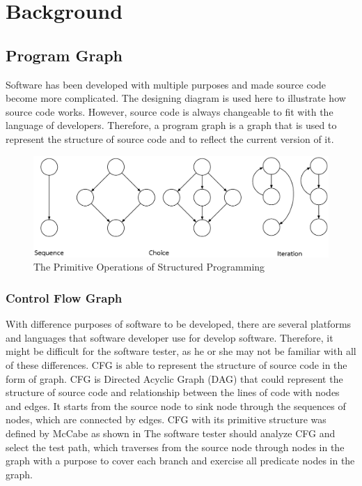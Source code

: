\section{Background}

\subsection{Program Graph}

Software has been developed with multiple purposes and made 
source code become more complicated. The designing diagram 
is used here to illustrate how source code works. However, 
source code is always changeable to fit with the language 
of developers. Therefore, a program graph is a graph 
that is used to represent the structure of source code and 
to reflect the current version of it.

\begin{figure}[ht!]
    \centering
    \includegraphics[width=0.9\linewidth]{figures/Primitive-Operation-Structure}
    \caption{The Primitive Operations of Structured Programming}
    \label{fig:primitiveoperations}
\end{figure}

\subsubsection{Control Flow Graph}
With difference purposes of software to be developed, 
there are several platforms and languages 
that software developer use for develop software. 
Therefore, it might be difficult for the software tester, 
as he or she may not be familiar with all of these differences. 
CFG is able to represent the structure of source code in 
the form of graph. CFG is Directed Acyclic Graph (DAG) 
that could represent the structure of source code and relationship 
between the lines of code with nodes and edges. It starts from 
the source node to sink node through the sequences of nodes, 
which are connected by edges. CFG with its primitive structure 
was defined by McCabe \cite{McCabe1976}  as shown in 
 The software tester should 
analyze CFG and select the test path, which traverses from 
the source node through nodes in the graph with a purpose 
to cover each branch and exercise all predicate nodes in the graph.


